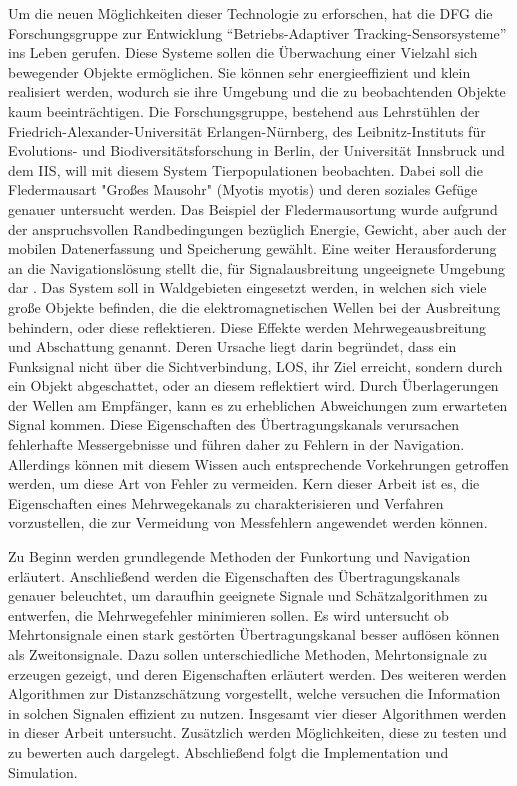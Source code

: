 Um die neuen Möglichkeiten dieser Technologie zu erforschen, hat die \gls{DFG} die Forschungsgruppe  zur Entwicklung "`Betriebs-Adaptiver Tracking-Sensorsysteme"' ins Leben gerufen. Diese Systeme sollen die Überwachung einer Vielzahl sich bewegender Objekte ermöglichen. Sie können sehr energieeffizient und klein realisiert werden, wodurch sie ihre Umgebung und die zu beobachtenden Objekte kaum beeinträchtigen. Die Forschungsgruppe, bestehend aus Lehrstühlen der Friedrich-Alexander-Universität Erlangen-Nürnberg, des Leibnitz-Instituts für Evolutions- und Biodiversitätsforschung in Berlin, der Universität Innsbruck und dem \gls{IIS}, will mit diesem System Tierpopulationen beobachten. Dabei soll die Fledermausart "Großes Mausohr" (Myotis myotis) und deren soziales Gefüge genauer untersucht werden. Das Beispiel der Fledermausortung wurde aufgrund der anspruchsvollen Randbedingungen bezüglich Energie, Gewicht, aber auch der mobilen Datenerfassung und Speicherung gewählt. Eine weiter Herausforderung an die Navigationslösung stellt die, für Signalausbreitung ungeeignete Umgebung dar \cite{dfg}. Das System soll in Waldgebieten eingesetzt werden, in welchen sich viele große Objekte befinden, die die elektromagnetischen Wellen bei der Ausbreitung behindern, oder diese reflektieren. Diese Effekte werden Mehrwegeausbreitung und Abschattung genannt. Deren Ursache liegt darin begründet, dass ein Funksignal nicht über die Sichtverbindung, \gls{LOS}, ihr Ziel erreicht, sondern durch ein Objekt abgeschattet, oder an diesem reflektiert wird. Durch Überlagerungen der Wellen am Empfänger, kann es zu erheblichen Abweichungen zum erwarteten Signal kommen. Diese Eigenschaften des Übertragungskanals verursachen fehlerhafte Messergebnisse und führen daher zu Fehlern in der Navigation. Allerdings können mit diesem Wissen auch entsprechende Vorkehrungen getroffen werden, um diese Art von Fehler zu vermeiden. Kern dieser Arbeit ist es, die Eigenschaften eines Mehrwegekanals zu charakterisieren und Verfahren vorzustellen, die zur Vermeidung von Messfehlern angewendet werden können. 

Zu Beginn werden grundlegende Methoden der Funkortung und Navigation erläutert. Anschließend werden die Eigenschaften des Übertragungskanals genauer beleuchtet, um daraufhin geeignete Signale und Schätzalgorithmen zu entwerfen, die Mehrwegefehler minimieren sollen. Es wird untersucht ob Mehrtonsignale einen stark gestörten Übertragungskanal besser auflösen können als Zweitonsignale. Dazu sollen unterschiedliche Methoden, Mehrtonsignale zu erzeugen gezeigt, und deren Eigenschaften erläutert werden. Des weiteren werden Algorithmen zur Distanzschätzung vorgestellt, welche versuchen die Information in solchen Signalen effizient zu nutzen. Insgesamt vier dieser Algorithmen werden in dieser Arbeit untersucht. Zusätzlich werden Möglichkeiten, diese zu testen und zu bewerten auch dargelegt. Abschließend folgt die Implementation und Simulation.   

